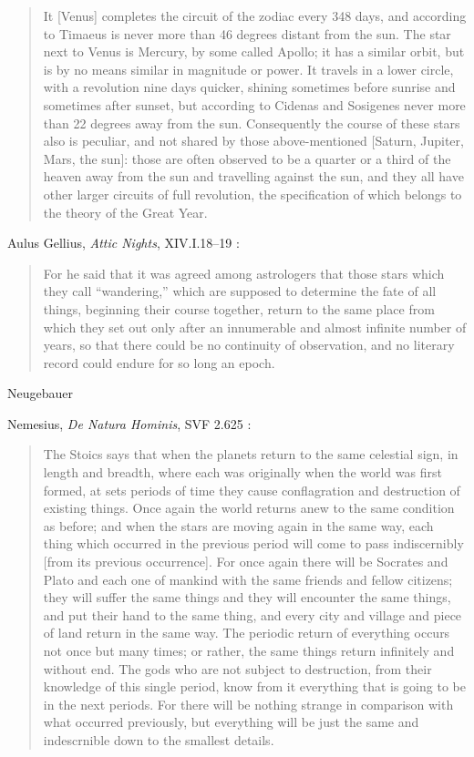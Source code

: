 \documentclass{amsart}
\theoremstyle{definition}
\begin{document}
\begin{quote}
It [Venus] completes the circuit of the zodiac every 348 days, and according to Timaeus is never more than 46 degrees
distant from the sun. The star next to Venus is Mercury, by some called Apollo; it has a similar orbit, but is by no means similar in magnitude or
power. It travels in a lower circle, with a revolution nine days quicker, shining sometimes before sunrise and sometimes after sunset, but according to Cidenas
and Sosigenes never more than 22 degrees away from the sun. Consequently the course of these stars also is peculiar, and not shared by those above-mentioned [Saturn, Jupiter,
Mars, the sun]:
those are often observed to be a quarter or a third of the heaven away from the sun and travelling against the sun, and they all have other larger circuits of full revolution,
the specification of which belongs to the theory of the Great Year.
\end{quote}

Aulus Gellius, {\em Attic Nights}, XIV.I.18--19 \cite[pp.~9-11]{gellius}:

\begin{quote}
For he said that it was agreed among astrologers that those stars which they call ``wandering,'' which are supposed to determine the fate of all things,
beginning their course together, return to the same place from which they set out only after an innumerable and almost infinite number of years, so that there could be no continuity
of observation, and no literary record could endure for so long an epoch.
\end{quote}

Neugebauer \cite[p.~618, 749]{neugebauer}


Nemesius, {\em De Natura Hominis}, SVF 2.625 \cite[p.~309]{longsedleyI}:

\begin{quote}
The Stoics says that when the planets return to the same celestial sign, in length and breadth, where each was originally when the world was first formed,
at sets periods of time they cause conflagration and destruction of existing things. Once again the world returns anew to the same condition as before; and when
the stars are moving again in the same way, each thing which occurred in the previous period will come to pass indiscernibly [from its previous occurrence]. For
once again there will be Socrates and Plato and each one of mankind with the same friends and fellow citizens; they will suffer the same things and they will encounter
the same things, and put their hand to the same thing, and every city and village and piece of land return in the same way. The periodic return of everything occurs not
once but many times; or rather, the same things return infinitely and without end. The gods who are not subject to destruction, from their knowledge of this single
period, know from it everything that is going to be in the next periods. For there will be nothing strange in comparison with what occurred previously, but everything
will be just the same and indescrnible down to the smallest details.
\end{quote}
 
\end{document}
